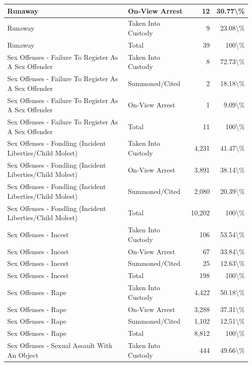 \documentclass[
]{krantz}
\begin{document}
\begin{longtable}[t]{l|l|r|r}
\hline
Runaway & On-View Arrest & 12 & 30.77\textbackslash{}\%\\
\hline
Runaway & Taken Into Custody & 9 & 23.08\textbackslash{}\%\\
\hline
Runaway & Total & 39 & 100\textbackslash{}\%\\
\hline
Sex Offenses - Failure To Register As A Sex Offender & Taken Into Custody & 8 & 72.73\textbackslash{}\%\\
\hline
Sex Offenses - Failure To Register As A Sex Offender & Summoned/Cited & 2 & 18.18\textbackslash{}\%\\
\hline
Sex Offenses - Failure To Register As A Sex Offender & On-View Arrest & 1 & 9.09\textbackslash{}\%\\
\hline
Sex Offenses - Failure To Register As A Sex Offender & Total & 11 & 100\textbackslash{}\%\\
\hline
Sex Offenses - Fondling (Incident Liberties/Child Molest) & Taken Into Custody & 4,231 & 41.47\textbackslash{}\%\\
\hline
Sex Offenses - Fondling (Incident Liberties/Child Molest) & On-View Arrest & 3,891 & 38.14\textbackslash{}\%\\
\hline
Sex Offenses - Fondling (Incident Liberties/Child Molest) & Summoned/Cited & 2,080 & 20.39\textbackslash{}\%\\
\hline
Sex Offenses - Fondling (Incident Liberties/Child Molest) & Total & 10,202 & 100\textbackslash{}\%\\
\hline
Sex Offenses - Incest & Taken Into Custody & 106 & 53.54\textbackslash{}\%\\
\hline
Sex Offenses - Incest & On-View Arrest & 67 & 33.84\textbackslash{}\%\\
\hline
Sex Offenses - Incest & Summoned/Cited & 25 & 12.63\textbackslash{}\%\\
\hline
Sex Offenses - Incest & Total & 198 & 100\textbackslash{}\%\\
\hline
Sex Offenses - Rape & Taken Into Custody & 4,422 & 50.18\textbackslash{}\%\\
\hline
Sex Offenses - Rape & On-View Arrest & 3,288 & 37.31\textbackslash{}\%\\
\hline
Sex Offenses - Rape & Summoned/Cited & 1,102 & 12.51\textbackslash{}\%\\
\hline
Sex Offenses - Rape & Total & 8,812 & 100\textbackslash{}\%\\
\hline
Sex Offenses - Sexual Assault With An Object & Taken Into Custody & 444 & 49.66\textbackslash{}\%\\

\end{longtable}
\end{document}
